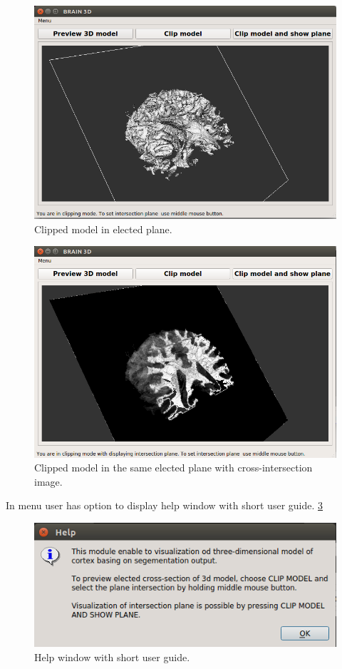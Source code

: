 \begin{figure}[H]
\centering{}\includegraphics[scale=0.7]{figures/Module_11/11_test_7.png}\caption{Clipped model in elected plane. \label{fig:figures/11_test_7}}
\end{figure}

\begin{figure}[H]
\centering{}\includegraphics[scale=0.7]{figures/Module_11/11_test_8.png}\caption{Clipped model in the same elected plane with cross-intersection image. \label{fig:figures/11_test_8}}
\end{figure}


\indent In menu user has option to display help window with short user guide. \ref{fig:figures/11_help}
\begin{figure}[H]
\centering{}\includegraphics[scale=0.7]{figures/Module_11/11_help.png}\caption{Help window with short user guide. \label{fig:figures/11_help}}
\end{figure}

